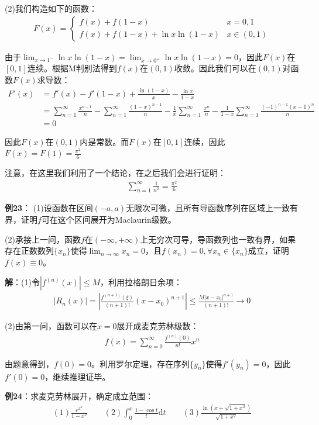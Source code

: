 \documentclass{ctexart}
\let\oldtextbf\textbf
\renewcommand{\textbf}[1]{\textcolor{brown!50!red}{\oldtextbf{#1}}}
\begin{document}
(2)我们构造如下的函数：
\begin{align*}
  F(x)=\begin{cases}
f(x)+f(1-x)& x=0,1\\
f(x)+f(1-x)+\ln x\ln(1-x)&x\in(0,1)
\end{cases}
\end{align*}

由于$\lim_{x\to 1^{-}}\ln x\ln(1-x)=\lim_{x\to 0^+}\ln x\ln(1-x)=0$，因此$F(x)$在$[0,1]$连续。根据M判别法得到$f(x)$在$(0,1)$收敛。因此我们可以在$(0,1)$对函数$F(x)$求导数：
\begin{align*}
  F'(x)&=f'(x)-f'(1-x)+\frac{\ln(1-x)}{x}-\frac{\ln x}{1-x}\\
&=\sum_{n=1}^\infty \frac{x^{n-1}}{n}-\sum_{n=1}^\infty \frac{(1-x)^{n-1}}{n} -\frac{1}{x}\sum _{n=1}
^\infty\frac{x^n}{n}-\frac{1}{1-x}\sum_{n=1}^\infty \frac{(-1)^{n-1}(x-1)^n}{n}   \\
&=0   
\end{align*}

因此$F(x)$在$(0,1)$内是常数。而$F(x)$在$[0,1]$连续，因此$F(x)=F(1)=\frac{\pi^2}{6}$

注意，在这里我们利用了一个结论，在之后我们会进行证明：
\begin{align*}
    \sum_{n=1}^\infty\frac{1}{n^2}=\frac{\pi^2}{6}
\end{align*}

\textbf{\color{brown!50!red}例23}： (1)设函数在区间$(-a,a)$无限次可微，且所有导函数序列在区域上一致有界，证明$f$可在这个区间展开为Maclaurin级数。

(2)承接上一问，函数$f$在$(-\infty,+\infty)$上无穷次可导，导函数列也一致有界，如果存在正数数列$\{x_n\}$使得$\lim_{n\to\infty}x_n=0$，且$f(x_n)=0,\forall x_n\in\{x_n\}$成立，证明$f(x)\equiv 0$。

\textbf{\color{brown!50!red}解}：(1)令$|f^(n)(x)|\leq M$，利用拉格朗日余项：
\begin{align*}
  |R_n(x)|=|\frac{f^{(n+1)}(\xi)}{(n+1)!}(x-x_0)^{n+1} |\leq\frac{M|x-x_0|^{n+1}}{(n+1)!}\to 0 
\end{align*}

(2)由第一问，函数可以在$x=0$展开成麦克劳林级数：
\begin{align*}
  f(x)=\sum_{n=0}^\infty \frac{f^{(n)}(0)}{n!}x^n 
\end{align*}

由题意得到，$f(0)=0$。利用罗尔定理，存在序列$\{y_n\}$使得$f'(y_n)=0$，因此$f'(0)=0$，继续推理证毕。

\textbf{\color{brown!50!red}例24}：求麦克劳林展开，确定成立范围：
\begin{align*}
    (1)\frac{e^{x^2}}{1-x^2}\qquad (2)\int_0^x\frac{1-\cos t}{t}\mathrm{d}t\qquad(3) \frac{\ln(x+\sqrt{1+x^2})}{\sqrt{1+x^2}}
\end{align*}
\end{document}
